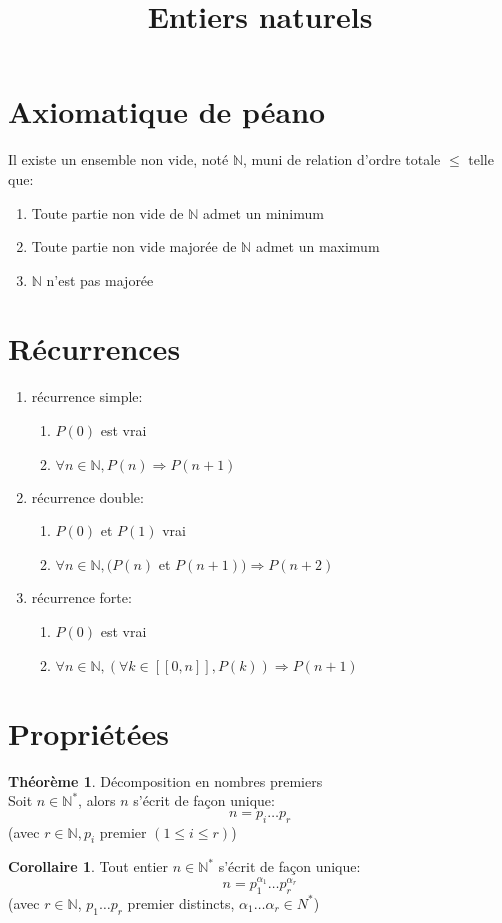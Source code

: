 \documentclass[fleqn]{article}
\title{Entiers naturels}
\date{}
\theoremstyle{definition} \newtheorem*{defi}{D\'efinition}
\theoremstyle{definition} \newtheorem*{theo}{Th\'eor\`eme}
\theoremstyle{definition} \newtheorem*{coro}{Corollaire}
\theoremstyle{remark} \newtheorem*{rqs}{Remarques}
\theoremstyle{definition} \newtheorem*{prop}{Propri\'et\'e}
\begin{document}
\maketitle

\section{Axiomatique de p\'eano}
Il existe un ensemble non vide, not\'e $\mathbb{N}$, muni de relation d'ordre totale $\leq$ telle que:
\begin{enumerate}
	\item Toute partie non vide de $\mathbb{N}$ admet un minimum
	\item Toute partie non vide major\'ee de $\mathbb{N}$ admet un maximum
	\item $\mathbb{N}$ n'est pas major\'ee
\end{enumerate}

\section{R\'ecurrences}
\begin{enumerate}
	\item r\'ecurrence simple:
		\begin{enumerate}
			\item $P(0)$ est vrai
			\item $\forall n \in \mathbb{N}, P(n) \Rightarrow P(n+1)$
		\end{enumerate}
	\item r\'ecurrence double:
		\begin{enumerate}
			\item $P(0)$ et $P(1)$ vrai
			\item $\forall n \in \mathbb{N}, (P(n)$ et $P(n+1)) \Rightarrow P(n+2)$
		\end{enumerate}
	\item r\'ecurrence forte:
		\begin{enumerate}
			\item $P(0)$ est vrai
			\item $\forall n \in \mathbb{N}, (\forall k \in [\![0,n]\!], P(k)) \Rightarrow P(n+1)$
		\end{enumerate}
\end{enumerate}

\section{Propri\'et\'ees}
\begin{theo} D\'ecomposition en nombres premiers \\
		Soit $n \in \mathbb{N}^*$, alors $n$ s'\'ecrit de fa\c{c}on unique:
		\[n = p_i \ldots p_r\] (avec $r \in \mathbb{N}, p_i$ premier $(1 \leq i \leq r)$)
\end{theo}
\begin{coro}
	Tout entier $n \in \mathbb{N}^*$ s'\'ecrit de fa\c{c}on unique:
	\[n = p_1^{\alpha_1} \ldots p_r^{\alpha_r}\] (avec $r \in \mathbb{N}$,
	$p_1 \ldots p_r$ premier distincts, $\alpha_1 \ldots \alpha_r \in {N}^*$)
\end{coro}
\end{document}

